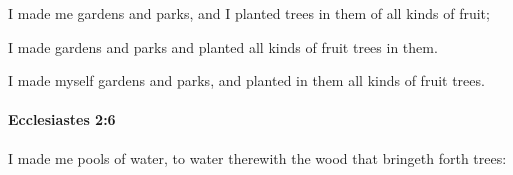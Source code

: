 			\begin{versebox}
					\item[BHS] 
					\item[LXX] 
					\item[ASV] I made me gardens and parks, and I planted trees in them of all kinds of fruit;
					\item[NIV] I made gardens and parks and planted all kinds of fruit trees in them.
					\item[NRSV] I made myself gardens and parks, and planted in them all kinds of fruit trees.
			\end{versebox}

		\paragraph{Ecclesiastes 2:6} %
			\label{ECCLESIASTES-2-6}

			I made me pools of water, to water therewith the wood that bringeth forth trees:

